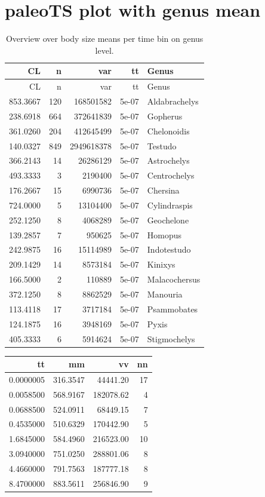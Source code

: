 \documentclass[]{article}
\begin{document}
\newpage

\section{paleoTS plot with genus
mean}\label{paleots-plot-with-genus-mean}

\begin{longtable}[]{@{}rrrrl@{}}
\caption{Overview over body size means per time bin on genus
level.}\tabularnewline
\toprule
CL & n & var & tt & Genus\tabularnewline
\midrule
\endfirsthead
\toprule
CL & n & var & tt & Genus\tabularnewline
\midrule
\endhead
853.3667 & 120 & 168501582 & 5e-07 & Aldabrachelys\tabularnewline
238.6918 & 664 & 372641839 & 5e-07 & Gopherus\tabularnewline
361.0260 & 204 & 412645499 & 5e-07 & Chelonoidis\tabularnewline
140.0327 & 849 & 2949618378 & 5e-07 & Testudo\tabularnewline
366.2143 & 14 & 26286129 & 5e-07 & Astrochelys\tabularnewline
493.3333 & 3 & 2190400 & 5e-07 & Centrochelys\tabularnewline
176.2667 & 15 & 6990736 & 5e-07 & Chersina\tabularnewline
724.0000 & 5 & 13104400 & 5e-07 & Cylindraspis\tabularnewline
252.1250 & 8 & 4068289 & 5e-07 & Geochelone\tabularnewline
139.2857 & 7 & 950625 & 5e-07 & Homopus\tabularnewline
242.9875 & 16 & 15114989 & 5e-07 & Indotestudo\tabularnewline
209.1429 & 14 & 8573184 & 5e-07 & Kinixys\tabularnewline
166.5000 & 2 & 110889 & 5e-07 & Malacochersus\tabularnewline
372.1250 & 8 & 8862529 & 5e-07 & Manouria\tabularnewline
113.4118 & 17 & 3717184 & 5e-07 & Psammobates\tabularnewline
124.1875 & 16 & 3948169 & 5e-07 & Pyxis\tabularnewline
405.3333 & 6 & 5914624 & 5e-07 & Stigmochelys\tabularnewline
\bottomrule
\end{longtable}

\begin{longtable}[]{@{}rrrr@{}}
\toprule
tt & mm & vv & nn\tabularnewline
\midrule
\endhead
0.0000005 & 316.3547 & 44441.20 & 17\tabularnewline
0.0058500 & 568.9167 & 182078.62 & 4\tabularnewline
0.0688500 & 524.0911 & 68449.15 & 7\tabularnewline
0.4535000 & 510.6329 & 170442.90 & 5\tabularnewline
1.6845000 & 584.4960 & 216523.00 & 10\tabularnewline
3.0940000 & 751.0250 & 288801.06 & 8\tabularnewline
4.4660000 & 791.7563 & 187777.18 & 8\tabularnewline
8.4700000 & 883.5611 & 256846.90 & 9\tabularnewline
\bottomrule
\end{longtable}
\end{document}
